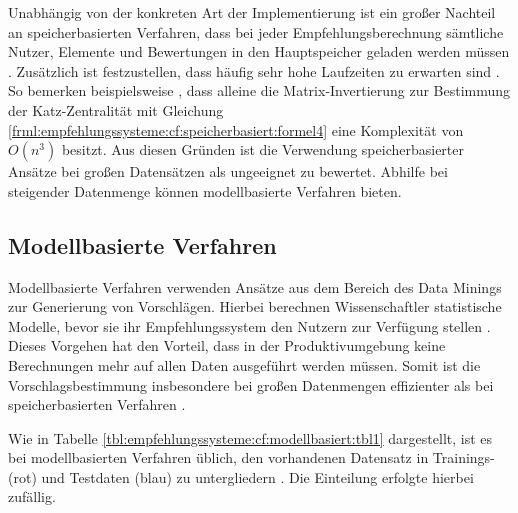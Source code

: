 Unabhängig von der konkreten Art der Implementierung ist ein großer Nachteil an speicherbasierten Verfahren, dass bei jeder Empfehlungsberechnung sämtliche Nutzer, Elemente und Bewertungen in den Hauptspeicher geladen werden müssen \cite[S. 8]{yang:2016}. Zusätzlich ist festzustellen, dass häufig sehr hohe Laufzeiten zu erwarten sind \cite[S. 2]{zhang:2010}. So bemerken beispielsweise \textcite[S. 3]{landherr:2010}, dass alleine die Matrix-Invertierung zur Bestimmung der Katz-Zentralität mit Gleichung \ref{frml:empfehlungssysteme:cf:speicherbasiert:formel4} eine Komplexität von $O(n^3)$ besitzt. Aus diesen Gründen ist die Verwendung speicherbasierter Ansätze bei großen Datensätzen als ungeeignet zu bewertet. Abhilfe bei steigender Datenmenge können modellbasierte Verfahren bieten.

\subsection{Modellbasierte Verfahren}
\label{ch:empfehlungssysteme:cf:modellbasiert}
Modellbasierte Verfahren verwenden Ansätze aus dem Bereich des Data Minings zur Generierung von Vorschlägen. Hierbei berechnen Wissenschaftler statistische Modelle, bevor sie ihr Empfehlungssystem den Nutzern zur Verfügung stellen \cite[S. 2]{cui:2020}. Dieses Vorgehen hat den Vorteil, dass in der Produktivumgebung keine Berechnungen mehr auf allen Daten ausgeführt werden müssen. Somit ist die Vorschlagsbestimmung insbesondere bei großen Datenmengen effizienter als bei speicherbasierten Verfahren \cite[S. 8]{yang:2016}.

Wie in Tabelle \ref{tbl:empfehlungssysteme:cf:modellbasiert:tbl1} dargestellt, ist es bei modellbasierten Verfahren üblich, den vorhandenen Datensatz in Trainings- (rot) und Testdaten (blau) zu untergliedern \cite[S. 71f.]{recommenderSystems:2016}. Die Einteilung erfolgte hierbei zufällig.%

